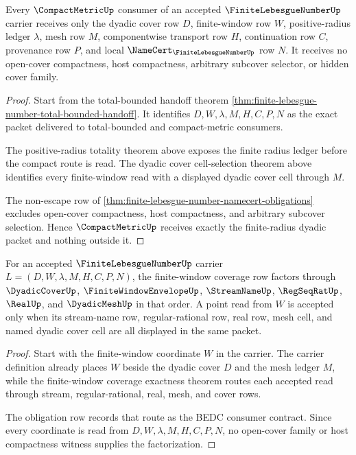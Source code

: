 \begin{theorem}
\label{thm:finite-lebesgue-number-compact-metric-handoff-exactness}
Every $\CompactMetricUp$ consumer of an accepted $\FiniteLebesgueNumberUp$ carrier receives only the dyadic cover row $D$, finite-window row $W$, positive-radius ledger $\lambda$, mesh row $M$, componentwise transport row $H$, continuation row $C$, provenance row $P$, and local $\NameCert_{\FiniteLebesgueNumberUp}$ row $N$. It receives no open-cover compactness, host compactness, arbitrary subcover selector, or hidden cover family.
\end{theorem}
\begin{proof}
Start from the total-bounded handoff theorem \autoref{thm:finite-lebesgue-number-total-bounded-handoff}. It identifies $D,W,\lambda,M,H,C,P,N$ as the exact packet delivered to total-bounded and compact-metric consumers.

The positive-radius totality theorem above exposes the finite radius ledger before the compact route is read. The dyadic cover cell-selection theorem above identifies every finite-window read with a displayed dyadic cover cell through $M$.

The non-escape row of \autoref{thm:finite-lebesgue-number-namecert-obligations} excludes open-cover compactness, host compactness, and arbitrary subcover selection. Hence $\CompactMetricUp$ receives exactly the finite-radius dyadic packet and nothing outside it.
\end{proof}

\begin{theorem}
\label{thm:finite-lebesgue-number-obligation-coverage-row}
For an accepted $\FiniteLebesgueNumberUp$ carrier $L=(D,W,\lambda,M,H,C,P,N)$, the finite-window coverage row factors through $\DyadicCoverUp$, $\FiniteWindowEnvelopeUp$, $\StreamNameUp$, $\RegSeqRatUp$, $\RealUp$, and $\DyadicMeshUp$ in that order. A point read from $W$ is accepted only when its stream-name row, regular-rational row, real row, mesh cell, and named dyadic cover cell are all displayed in the same packet.
\end{theorem}
\begin{proof}
Start with the finite-window coordinate $W$ in the carrier. The carrier definition already places $W$ beside the dyadic cover $D$ and the mesh ledger $M$, while the finite-window coverage exactness theorem routes each accepted read through stream, regular-rational, real, mesh, and cover rows.

The obligation row records that route as the BEDC consumer contract. Since every coordinate is read from $D,W,\lambda,M,H,C,P,N$, no open-cover family or host compactness witness supplies the factorization.
\end{proof}


